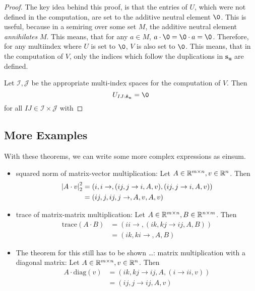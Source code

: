 \begin{proof}
    The key idea behind this proof, is that the entries of $U$, which were not defined in the computation, are set to the additive neutral element $\0$.
    This is useful, because in a semiring over some set $M$, the additive neutral element \textit{annihilates} $M$.
    This means, that for any $a \in M$, $a \cdot \0 = \0 \cdot a = \0$.
    Therefore, for any multiindex where $U$ is set to $\0$, $V$ is also set to $\0$.
    This means, that in the computation of $V$, only the indices which follow the duplications in $\bm{s_u}$ are defined.

    Let $\mathcal{I}, \mathcal{J}$ be the appropriate multi-index spaces for the computation of $V$. Then
    $$U_{IJ:\bm{\hat{s}_u}} = \0$$
    for all $IJ \in \mathcal{I} \times \mathcal{J}$ with
\end{proof}

\subsection{More Examples}
With these theorems, we can write some more complex expressions as einsum.
\begin{itemize}
    \item squared norm of matrix-vector multiplication: Let $A \in \mathbb{R}^{m \times n}, v \in \mathbb{R}^{n}$. Then
          \begin{align*}
              \left| A \cdot v \right|_2^2 & = (i,i\rightarrow,(ij, j \rightarrow i, A, v),(ij, j \rightarrow i, A, v)) \\
                                  & = (ij,j,ij,j\rightarrow,A,v,A,v)
          \end{align*}
    \item trace of matrix-matrix multiplication: Let $A \in \mathbb{R}^{m \times n}, B \in \mathbb{R}^{n \times m}$. Then
          \begin{align*}
              \text{trace}(A \cdot B) & = (ii \rightarrow, (ik, kj \rightarrow ij, A, B)) \\
                                      & = (ik, ki \rightarrow, A, B)
          \end{align*}
    \item The theorem for this still has to be shown \dots:
          matrix multiplication with a diagonal matrix: Let $A \in \mathbb{R}^{m \times n}, v \in \mathbb{R}^{n}$. Then
          \begin{align*}
              A \cdot \text{diag}(v) & = (ik, kj \rightarrow ij, A, (i \rightarrow ii, v)) \\
                                     & = (ij, j \rightarrow ij, A, v)                      \\
          \end{align*}
\end{itemize}

